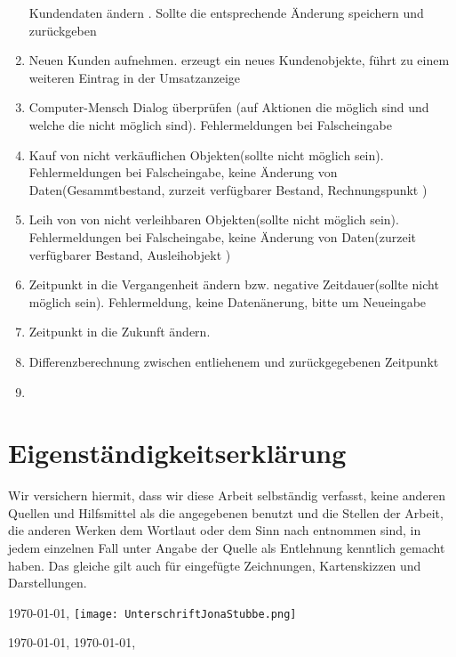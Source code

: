 \documentclass[a4paper,12pt,titlepage]{article}
\begin{document}
\begin{enumerate}
Kundendaten ändern .
\Rightarrow Sollte die entsprechende Änderung speichern und zurückgeben
\item
Neuen Kunden aufnehmen.
\Rightarrow erzeugt ein neues Kundenobjekte, führt zu einem weiteren Eintrag in der Umsatzanzeige
\item
Computer-Mensch Dialog überprüfen (auf Aktionen die möglich sind und welche die nicht möglich sind).
\Rightarrow Fehlermeldungen bei Falscheingabe
\item
Kauf von nicht verkäuflichen Objekten(sollte nicht möglich sein).
\Rightarrow Fehlermeldungen bei Falscheingabe, keine Änderung von Daten(Gesammtbestand, zurzeit verfügbarer Bestand, Rechnungspunkt )
\item
Leih von von nicht verleihbaren Objekten(sollte nicht möglich sein).
\Rightarrow Fehlermeldungen bei Falscheingabe, keine Änderung von Daten(zurzeit verfügbarer Bestand, Ausleihobjekt )
\item
Zeitpunkt in die Vergangenheit ändern bzw. negative Zeitdauer(sollte nicht möglich sein).
\Rightarrow Fehlermeldung, keine Datenänerung, bitte um Neueingabe
\item
Zeitpunkt in die Zukunft ändern.
\item
Differenzberechnung zwischen entliehenem und zurückgegebenen Zeitpunkt
\item

\end{enumerate}
\appendix
\newpage
\part{Eigenständigkeitserklärung}
Wir versichern hiermit, dass wir diese Arbeit selbständig verfasst, keine anderen Quellen und Hilfsmittel
als die angegebenen benutzt und die Stellen der Arbeit, die anderen Werken dem Wortlaut oder dem Sinn nach entnommen sind,
in jedem einzelnen Fall unter Angabe der Quelle als Entlehnung kenntlich gemacht haben.
Das gleiche gilt auch für eingefügte Zeichnungen, Kartenskizzen und Darstellungen.

\today, \texttt{[image: UnterschriftJonaStubbe.png]}

\today, 
\today,
\end{document}
